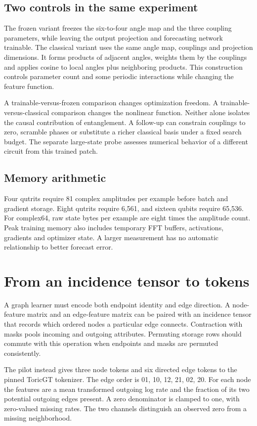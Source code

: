 \documentclass[11pt,oneside,openany]{book}
\begin{document}
\section*{Two controls in the same experiment}
The frozen variant freezes the six-to-four angle map and the three coupling parameters, while leaving the output projection and forecasting network trainable. The classical variant uses the same angle map, couplings and projection dimensions. It forms products of adjacent angles, weights them by the couplings and applies cosine to local angles plus neighboring products. This construction controls parameter count and some periodic interactions while changing the feature function.

A trainable-versus-frozen comparison changes optimization freedom. A trainable-versus-classical comparison changes the nonlinear function. Neither alone isolates the causal contribution of entanglement. A follow-up can constrain couplings to zero, scramble phases or substitute a richer classical basis under a fixed search budget. The separate large-state probe assesses numerical behavior of a different circuit from this trained patch.

\section*{Memory arithmetic}
Four qutrits require 81 complex amplitudes per example before batch and gradient storage. Eight qutrits require 6,561, and sixteen qubits require 65,536. For complex64, raw state bytes per example are eight times the amplitude count. Peak training memory also includes temporary FFT buffers, activations, gradients and optimizer state. A larger measurement has no automatic relationship to better forecast error.

\chapter{From an incidence tensor to tokens}
A graph learner must encode both endpoint identity and edge direction. A node-feature matrix and an edge-feature matrix can be paired with an incidence tensor that records which ordered nodes a particular edge connects. Contraction with masks pools incoming and outgoing attributes. Permuting storage rows should commute with this operation when endpoints and masks are permuted consistently.

The pilot instead gives three node tokens and six directed edge tokens to the pinned ToricGT tokenizer. The edge order is 01, 10, 12, 21, 02, 20. For each node the features are a mean transformed outgoing log rate and the fraction of its two potential outgoing edges present. A zero denominator is clamped to one, with zero-valued missing rates. The two channels distinguish an observed zero from a missing neighborhood.
\end{document}
